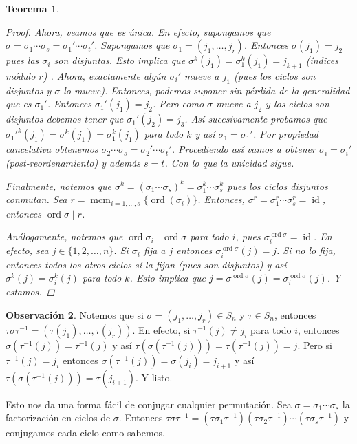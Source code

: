 \documentclass[12pt]{book}
\newtheorem{teo}{Teorema}[section]
\theoremstyle{definition}
\newtheorem{obs}[teo]{Observación}
\DeclareMathOperator{\id}{id}
\DeclareMathOperator{\mcm}{mcm}
\DeclareMathOperator{\ord}{ord}
\begin{document}
\begin{teo}
\begin{proof}
Ahora, veamos que es única. En efecto, supongamos que $\sigma = \sigma_1\cdots \sigma_s = \sigma_1' \cdots \sigma_t'$. Supongamos que $\sigma_1 = (j_1 ,\ldots , j_r)$. Entonces $\sigma (j_1) = j_2$ pues las $\sigma_i$ son disjuntas. Esto implica que $\sigma^k(j_1)=\sigma_1^k(j_1) = j_{k+1}$ (índices módulo $r$) . Ahora, exactamente algún $\sigma_i'$ mueve a $j_1$ (pues los ciclos son disjuntos y $\sigma$ lo mueve). Entonces, podemos suponer sin pérdida de la generalidad que es $\sigma_1'$. Entonces $\sigma_1'(j_1)=j_2$. Pero como $\sigma$ mueve a $j_2$ y los ciclos son disjuntos debemos tener que $\sigma_1'(j_2)=j_3$. Así sucesivamente probamos que $\sigma_1'^k(j_1) = \sigma^k(j_1)=\sigma_1^k(j_1)$ para todo $k$ y así $\sigma_1 = \sigma_1'$. Por propiedad cancelativa obtenemos $\sigma_2 \cdots \sigma_s = \sigma_2'\cdots \sigma_t'$. Procediendo así vamos a obtener $\sigma_i = \sigma_i'$ (post-reordenamiento) y además $s=t$. Con lo que la unicidad sigue.

Finalmente, notemos que $\sigma^k = (\sigma_1\cdots \sigma_s)^k = \sigma_1^k \cdots \sigma_s^k$ pues los ciclos disjuntos conmutan. Sea $r=\mcm_{i=1,\ldots ,s}\{\ord(\sigma_i)\}$. Entonces, $\sigma^r = \sigma_1^r \cdots \sigma_s^r = \id$, entonces $\ord\sigma \mid r$.

Análogamente, notemos que $\ord \sigma_i \mid \ord\sigma$ para todo $i$, pues $\sigma_i^{\ord\sigma} = \id$. En efecto, sea $j\in\{1,2,\ldots, n\}$. Si $\sigma_i$ fija a $j$ entonces $\sigma_i^{\ord\sigma}(j)=j$. Si no lo fija, entonces todos los otros ciclos sí la fijan (pues son disjuntos) y así $\sigma^k(j) = \sigma_i^k(j)$ para todo $k$. Esto implica que $j=\sigma^{\ord\sigma}(j)=\sigma_i^{\ord\sigma}(j)$. Y estamos.

\end{proof}

\end{teo}

\begin{obs}\label{obs::conjugarciclos}
Notemos que si $\sigma = (j_1, \ldots , j_r)\in S_n$ y $\tau\in S_n$, entonces $\tau \sigma \tau^{-1} = (\tau(j_1), \ldots , \tau (j_r))$. En efecto, si $\tau^{-1}(j)\neq j_i$ para todo $i$, entonces $\sigma(\tau^{-1}(j))=\tau^{-1}(j)$ y así $\tau(\sigma(\tau^{-1}(j))) = \tau(\tau^{-1}(j)) = j$. Pero si $\tau^{-1}(j) = j_i$ entonces $\sigma(\tau^{-1}(j)) = \sigma(j_i) = j_{i+1}$ y así $\tau(\sigma(\tau^{-1}(j))) = \tau(j_{i+1})$. Y listo.

Esto nos da una forma fácil de conjugar cualquier permutación. Sea $\sigma = \sigma_1\cdots \sigma_s$ la factorización en ciclos de $\sigma$. Entonces $\tau\sigma\tau^{-1} = (\tau\sigma_1\tau^{-1}) (\tau \sigma_2 \tau^{-1}) \cdots (\tau \sigma_s \tau^{-1})$ y conjugamos cada ciclo como sabemos.

\end{obs}
\end{document}
